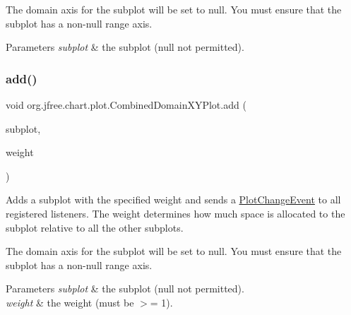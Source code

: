 The domain axis for the subplot will be set to {\ttfamily null}. You must ensure that the subplot has a non-\/null range axis.


\begin{DoxyParams}{Parameters}
{\em subplot} & the subplot ({\ttfamily null} not permitted). \\
\hline
\end{DoxyParams}
\mbox{\label{classorg_1_1jfree_1_1chart_1_1plot_1_1_combined_domain_x_y_plot_a99f4c4a98405fbf0d106e8345e04e724}} 
\subsubsection{\texorpdfstring{add()}{add()}\hspace{0.1cm}{\footnotesize\ttfamily [2/2]}}
{\footnotesize\ttfamily void org.\+jfree.\+chart.\+plot.\+Combined\+Domain\+X\+Y\+Plot.\+add (\begin{DoxyParamCaption}\item[{\mbox{\hyperlink{classorg_1_1jfree_1_1chart_1_1plot_1_1_x_y_plot}{X\+Y\+Plot}}}]{subplot,  }\item[{int}]{weight }\end{DoxyParamCaption})}

Adds a subplot with the specified weight and sends a \mbox{\hyperlink{}{Plot\+Change\+Event}} to all registered listeners. The weight determines how much space is allocated to the subplot relative to all the other subplots. 

The domain axis for the subplot will be set to {\ttfamily null}. You must ensure that the subplot has a non-\/null range axis.


\begin{DoxyParams}{Parameters}
{\em subplot} & the subplot ({\ttfamily null} not permitted). \\
\hline
{\em weight} & the weight (must be $>$= 1). \\
\hline
\end{DoxyParams}
\mbox{\label{classorg_1_1jfree_1_1chart_1_1plot_1_1_combined_domain_x_y_plot_a574fc059ba1ddc1ec5e24a656b4e7a41}} 

